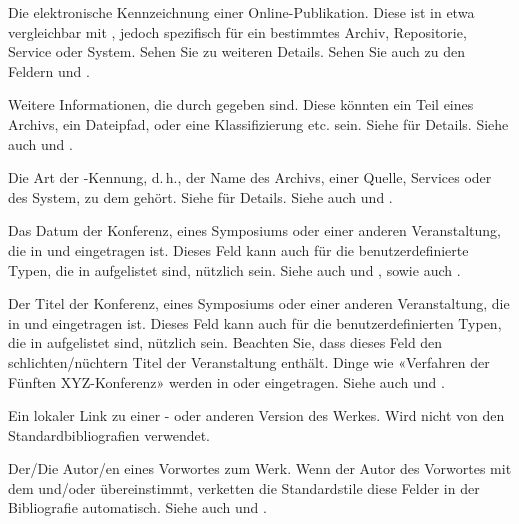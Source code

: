 \documentclass{ltxdockit}[2011/03/25]
\begin{document}
\begin{fieldlist}

Die elektronische Kennzeichnung einer Online-Publikation. Diese ist in etwa vergleichbar
mit , jedoch spezifisch für ein bestimmtes Archiv, Repositorie, Service
oder System. Sehen Sie  zu weiteren Details. Sehen Sie auch zu den
Feldern  und .


Weitere Informationen, die durch
 gegeben sind. Diese könnten ein Teil eines Archivs, ein
Dateipfad, oder eine Klassifizierung etc. sein. Siehe  für
Details. Siehe auch  und .


Die Art der -Kennung, d.\,h., der Name des Archivs, einer Quelle,
Services  oder des System, zu dem  gehört. Siehe
 für Details. Siehe auch  und
.


Das Datum der Konferenz, eines Symposiums oder einer anderen Veranstaltung, die
in  und  eingetragen ist. Dieses
Feld kann auch für die benutzerdefinierte Typen, die in 
aufgelistet sind, nützlich sein. Siehe auch  und
, sowie auch .


Der Titel der Konferenz, eines Symposiums oder einer anderen Veranstaltung, die
in  und  eingetragen ist. Dieses
Feld kann auch für die benutzerdefinierten Typen, die in 
aufgelistet sind, nützlich sein. Beachten Sie, dass dieses Feld den
schlichten/nüchtern Titel der Veranstaltung enthält. Dinge wie «Verfahren der
Fünften XYZ-Konferenz» werden in  oder
 eingetragen. Siehe auch  und
.


Ein lokaler Link zu einer - oder anderen Version des Werkes. Wird nicht
von den Standardbibliografien verwendet.


Der/Die Autor/en eines Vorwortes zum Werk. Wenn der
Autor des Vorwortes mit dem  und\slash oder
 übereinstimmt, verketten die Standardstile diese Felder
in der Bibliografie automatisch. Siehe auch  und
.


\end{fieldlist}
\end{document}
